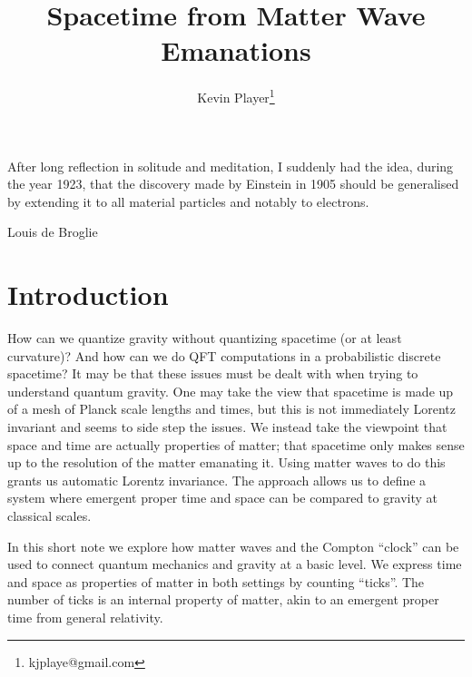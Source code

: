 \documentclass[12pt,a4paper]{article}
\begin{document}
\title{Spacetime from Matter Wave Emanations}
\author[1]{Kevin Player\footnote{kjplaye@gmail.com}}

\maketitle


\epigraph{After long reflection in solitude and meditation, I suddenly had the idea, during the year 1923, that the discovery made by Einstein in 1905 should be generalised by extending it to all material particles and notably to electrons.}{Louis de Broglie}



\section{Introduction}
How can we quantize gravity without quantizing spacetime (or at least curvature)? And how can we do QFT computations in a probabilistic discrete spacetime?  It may be that these issues must be dealt with when trying to understand quantum gravity.  One may take the view that spacetime is made up of a mesh of Planck scale lengths and times, but this is not immediately Lorentz invariant and seems to side step the issues.  We instead take the viewpoint that space and time are actually properties of matter; that spacetime only makes sense up to the resolution of the matter emanating it.  Using matter waves to do this grants us automatic Lorentz invariance.  The approach allows us to define a system where emergent proper time and space can be compared to gravity at classical scales.

In this short note we explore how matter waves \cite{debroglie} and the Compton ``clock'' \cite{clock} can be used to connect quantum mechanics and gravity at a basic level.  We express time and space as properties of matter in both settings by counting ``ticks''.  The number of ticks is an internal property of matter, akin to an emergent proper time from general relativity.
\end{document}
